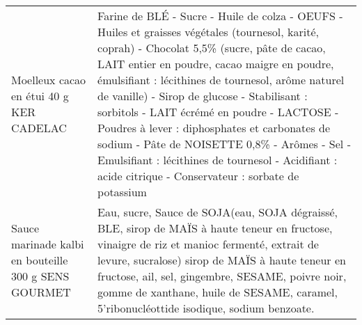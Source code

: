 \begin{longtable}{p{5cm}p{10cm}}
                                                                  Moelleux cacao en étui 40 g KER CADELAC &                                                                                                                                                                                                                                                                                                                                                                                                                                                                              Farine de BLÉ - Sucre - Huile de colza - OEUFS - Huiles et graisses végétales (tournesol, karité, coprah) - Chocolat 5,5\% (sucre, pâte de cacao, LAIT entier en poudre, cacao maigre en poudre, émulsifiant : lécithines de tournesol, arôme naturel de vanille) - Sirop de glucose - Stabilisant : sorbitols - LAIT écrémé en poudre - LACTOSE - Poudres à lever : diphosphates et carbonates de sodium - Pâte de NOISETTE 0,8\% - Arômes - Sel - Emulsifiant : lécithines de tournesol - Acidifiant : acide citrique - Conservateur : sorbate de potassium \\
                                                     Sauce marinade kalbi en bouteille 300 g SENS GOURMET &                                                                                                                                                                                                                                                                                                                                                                                                                                                                                                                                                                                                                                                                                            Eau, sucre, Sauce de SOJA(eau, SOJA dégraissé, BLE, sirop de MAÏS à haute teneur en fructose, vinaigre de riz et manioc fermenté, extrait de levure, sucralose) sirop de MAÏS à haute teneur en fructose, ail, sel, gingembre, SESAME, poivre noir, gomme de xanthane, huile de SESAME, caramel, 5'ribonucléottide isodique, sodium benzoate. \\

\end{longtable}
